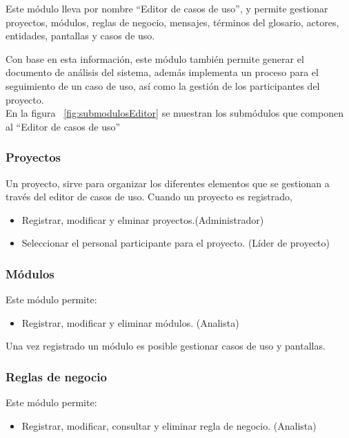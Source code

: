 Este módulo lleva por nombre ``Editor de casos de uso'', y permite gestionar proyectos, módulos, reglas de negocio, mensajes, términos del glosario, actores, entidades, pantallas y casos de uso.

Con base en esta información, este módulo también permite generar el documento de análisis del sistema, además implementa un proceso para el seguimiento de un caso de uso, así como la gestión de los participantes del proyecto.\\

En la figura ~\ref{fig:submodulosEditor} se muestran los submódulos que componen al ``Editor de casos de uso''


\subsubsection{Proyectos}
	Un proyecto, sirve para organizar los diferentes elementos que se gestionan a través del editor de casos de uso. Cuando un proyecto es registrado, 
	
	\begin{itemize}
		\item Registrar, modificar y elminar proyectos.(Administrador)
		\item Seleccionar el personal participante para el proyecto. (Líder de proyecto)
	\end{itemize}
			
\subsubsection{Módulos}
	Este módulo permite:
	\begin{itemize}
		\item Registrar, modificar y eliminar módulos. (Analista)
	\end{itemize}

	Una vez registrado un módulo es posible gestionar casos de uso y pantallas.


\subsubsection{Reglas de negocio}
	Este módulo permite:
	\begin{itemize}
		\item Registrar, modificar, consultar y eliminar regla de negocio. (Analista)
	\end{itemize}

